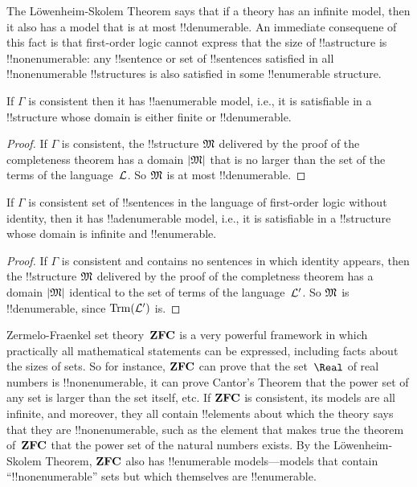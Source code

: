 \documentclass[../../../include/open-logic-section]{subfiles}
\begin{document}

The L\"owenheim-Skolem Theorem says that if a theory has an infinite
model, then it also has a model that is at most !!{denumerable}. An
immediate consequene of this fact is that first-order logic cannot
express that the size of !!a{structure} is !!{nonenumerable}: any
!!{sentence} or set of !!{sentence}s satisfied in all
!!{nonenumerable} !!{structure}s is also satisfied in some
!!{enumerable} structure.

\begin{thm} 
 If $\Gamma$ is consistent then it has
!!a{enumerable} model, i.e., it is satisfiable in a !!{structure}
whose domain is either finite or !!{denumerable}.
\end{thm}

\begin{proof}
If $\Gamma$ is consistent, the !!{structure} $\mathfrak M$ delivered by
the proof of the completeness theorem has a domain $\left| \mathfrak M \right|$ that
is no larger than the set of the terms of the language~$\mathcal L$. So
$\mathfrak M$ is at most !!{denumerable}.
\end{proof}

\begin{thm}
 If $\Gamma$ is consistent set of !!{sentence}s
in the language of first-order logic without identity, then it has
!!a{denumerable} model, i.e., it is satisfiable in a !!{structure}
whose domain is infinite and !!{enumerable}.
\end{thm}

\begin{proof}
If $\Gamma$ is consistent and contains no sentences in which identity
appears, then the !!{structure} $\mathfrak M$ delivered by the proof of
the completness theorem has a domain $\left| \mathfrak M \right|$ identical to the set
of terms of the language~$\mathcal L'$. So $\mathfrak M$ is
!!{denumerable}, since $\Trm[L']$ is.
\end{proof}

\begin{ex}
Zermelo-Fraenkel set theory~$\mathbf{ZFC}$ is a very powerful framework
in which practically all mathematical statements can be expressed,
including facts about the sizes of sets. So for instance, $\mathbf{ZFC}$
can prove that the set~$\Real$ of real numbers is !!{nonenumerable},
it can prove Cantor's Theorem that the power set of any set is larger
than the set itself, etc.  If $\mathbf{ZFC}$ is consistent, its models
are all infinite, and moreover, they all contain !!{element}s about
which the theory says that they are !!{nonenumerable}, such as the
element that makes true the theorem of~$\mathbf{ZFC}$ that the power set
of the natural numbers exists. By the L\"owenheim-Skolem Theorem,
$\mathbf{ZFC}$ also has !!{enumerable} models---models that contain
``!!{nonenumerable}'' sets but which themselves are !!{enumerable}.
\end{ex}
\end{document}
